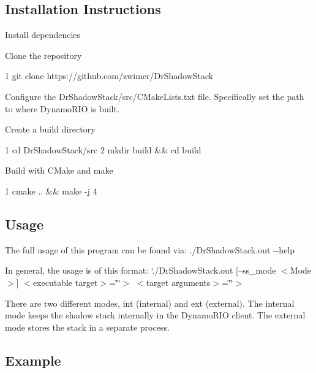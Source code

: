 \subsection*{Installation Instructions}


\begin{DoxyEnumerate}
\item Install dependencies
\item Clone the repository 
\begin{DoxyCode}
1 git clone https://github.com/zwimer/DrShadowStack
\end{DoxyCode}

\item Configure the {\ttfamily Dr\+Shadow\+Stack/src/\+C\+Make\+Lists.\+txt} file. Specifically set the path to where Dynamo\+R\+IO is built.
\item Create a build directory 
\begin{DoxyCode}
1 cd DrShadowStack/src
2 mkdir build && cd build
\end{DoxyCode}

\item Build with C\+Make and make 
\begin{DoxyCode}
1 cmake .. && make -j 4
\end{DoxyCode}

\end{DoxyEnumerate}

\subsection*{Usage}

The full usage of this program can be found via\+: {\ttfamily ./\+Dr\+Shadow\+Stack.out -\/-\/help}

In general, the usage is of this format\+: `./\+Dr\+Shadow\+Stack.out \mbox{[}--ss\+\_\+mode $<$\+Mode$>$\mbox{]} $<$executable target$>$=\char`\"{}\char`\"{}$>$ $<$target arguments$>$=\char`\"{}\char`\"{}$>$

There are two different modes, {\ttfamily int} (internal) and {\ttfamily ext} (external). The internal mode keeps the shadow stack internally in the Dynamo\+R\+IO client. The external mode stores the stack in a separate process.

\subsection*{Example}

